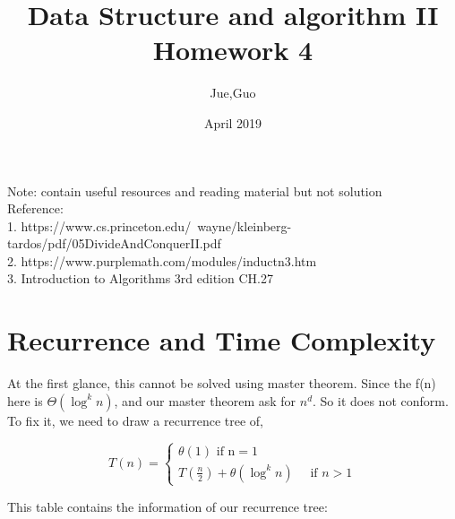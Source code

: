 \documentclass{article}
\title{Data Structure and algorithm II\\Homework 4}
\author{Jue,Guo}
\date{April 2019}
\begin{document}
\maketitle
Note: contain useful resources and reading material but not solution \\
Reference: \\
1. https://www.cs.princeton.edu/~wayne/kleinberg-tardos/pdf/05DivideAndConquerII.pdf \\
2. https://www.purplemath.com/modules/inductn3.htm \\
3. Introduction to Algorithms 3rd edition CH.27 \\

\section{Recurrence and Time Complexity}
    At the first glance, this cannot be solved using master theorem. Since the f(n) here is $\Theta(\log ^{k} n)$, and our master theorem ask for $n^d$. So it does not conform.
    To fix it, we need to draw a recurrence tree of,
    
   \begin{equation*}
    T(n)=\left\{\begin{array}{l}{\theta(1) \text { if } \mathrm{n}=1} \\ {T\left(\frac{n}{2}\right)+\theta\left(\log ^{k} n\right) \quad \text { if } n>1}\end{array}\right.
    \end{equation*}
    
    This table contains the information of our recurrence tree:
  
\end{document}
